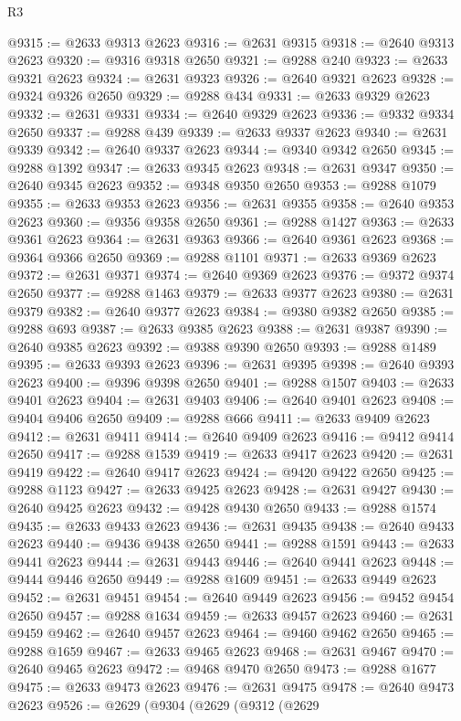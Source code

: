 \begin{lexlean}{R3}
\begin{coremodule}
@9315 := @2633 @9313 @2623
@9316 := @2631 @9315
@9318 := @2640 @9313 @2623
@9320 := @9316 @9318 @2650
@9321 := @9288 @240
@9323 := @2633 @9321 @2623
@9324 := @2631 @9323
@9326 := @2640 @9321 @2623
@9328 := @9324 @9326 @2650
@9329 := @9288 @434
@9331 := @2633 @9329 @2623
@9332 := @2631 @9331
@9334 := @2640 @9329 @2623
@9336 := @9332 @9334 @2650
@9337 := @9288 @439
@9339 := @2633 @9337 @2623
@9340 := @2631 @9339
@9342 := @2640 @9337 @2623
@9344 := @9340 @9342 @2650
@9345 := @9288 @1392
@9347 := @2633 @9345 @2623
@9348 := @2631 @9347
@9350 := @2640 @9345 @2623
@9352 := @9348 @9350 @2650
@9353 := @9288 @1079
@9355 := @2633 @9353 @2623
@9356 := @2631 @9355
@9358 := @2640 @9353 @2623
@9360 := @9356 @9358 @2650
@9361 := @9288 @1427
@9363 := @2633 @9361 @2623
@9364 := @2631 @9363
@9366 := @2640 @9361 @2623
@9368 := @9364 @9366 @2650
@9369 := @9288 @1101
@9371 := @2633 @9369 @2623
@9372 := @2631 @9371
@9374 := @2640 @9369 @2623
@9376 := @9372 @9374 @2650
@9377 := @9288 @1463
@9379 := @2633 @9377 @2623
@9380 := @2631 @9379
@9382 := @2640 @9377 @2623
@9384 := @9380 @9382 @2650
@9385 := @9288 @693
@9387 := @2633 @9385 @2623
@9388 := @2631 @9387
@9390 := @2640 @9385 @2623
@9392 := @9388 @9390 @2650
@9393 := @9288 @1489
@9395 := @2633 @9393 @2623
@9396 := @2631 @9395
@9398 := @2640 @9393 @2623
@9400 := @9396 @9398 @2650
@9401 := @9288 @1507
@9403 := @2633 @9401 @2623
@9404 := @2631 @9403
@9406 := @2640 @9401 @2623
@9408 := @9404 @9406 @2650
@9409 := @9288 @666
@9411 := @2633 @9409 @2623
@9412 := @2631 @9411
@9414 := @2640 @9409 @2623
@9416 := @9412 @9414 @2650
@9417 := @9288 @1539
@9419 := @2633 @9417 @2623
@9420 := @2631 @9419
@9422 := @2640 @9417 @2623
@9424 := @9420 @9422 @2650
@9425 := @9288 @1123
@9427 := @2633 @9425 @2623
@9428 := @2631 @9427
@9430 := @2640 @9425 @2623
@9432 := @9428 @9430 @2650
@9433 := @9288 @1574
@9435 := @2633 @9433 @2623
@9436 := @2631 @9435
@9438 := @2640 @9433 @2623
@9440 := @9436 @9438 @2650
@9441 := @9288 @1591
@9443 := @2633 @9441 @2623
@9444 := @2631 @9443
@9446 := @2640 @9441 @2623
@9448 := @9444 @9446 @2650
@9449 := @9288 @1609
@9451 := @2633 @9449 @2623
@9452 := @2631 @9451
@9454 := @2640 @9449 @2623
@9456 := @9452 @9454 @2650
@9457 := @9288 @1634
@9459 := @2633 @9457 @2623
@9460 := @2631 @9459
@9462 := @2640 @9457 @2623
@9464 := @9460 @9462 @2650
@9465 := @9288 @1659
@9467 := @2633 @9465 @2623
@9468 := @2631 @9467
@9470 := @2640 @9465 @2623
@9472 := @9468 @9470 @2650
@9473 := @9288 @1677
@9475 := @2633 @9473 @2623
@9476 := @2631 @9475
@9478 := @2640 @9473 @2623
@9526 := @2629
    (@9304
      (@2629
        (@9312
          (@2629

\end{coremodule}
\end{lexlean}
